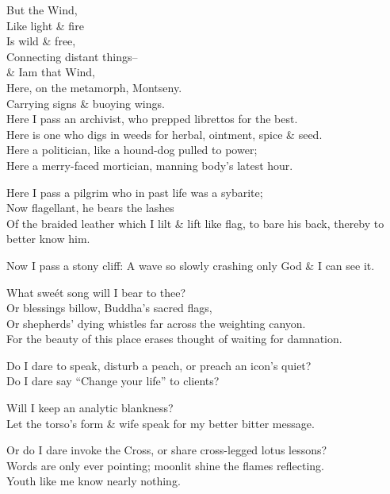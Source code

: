 
But the Wind, \\
Like light \& fire \\
Is wild \& free, \\
Connecting distant things-- \\
\& Iam that Wind, \\
Here, on the metamorph, Montseny. \\
Carrying signs \& buoying wings. \\
Here I pass an archivist, who prepped librettos for the best. \\ %
Here is one who digs in weeds for herbal, ointment, spice \& seed. \\
Here a politician, like a hound-dog pulled to power; \\
Here a merry-faced mortician, manning body's latest hour.

Here I pass a pilgrim who in past life was a sybarite; \\
Now flagellant, he bears the lashes \\
Of the braided leather which I lilt \& lift like flag, to bare his back, thereby to better know him.

Now I pass a stony cliff: A wave so slowly crashing only God \& I can see it. 

What sweét song will I bear to thee? \\
Or blessings billow, Buddha's sacred flags, \\
Or shepherds' dying whistles far across the weighting canyon. \\
For the beauty of this place erases thought of waiting for damnation.

Do I dare to speak, disturb a peach, or preach an icon's quiet? \\
Do I dare say ``Change your life'' to clients?

Will I keep an analytic blankness? \\
Let the torso's form \& wife speak for my better bitter message.

Or do I dare invoke the Cross, or share cross-legged lotus lessons? \\
Words are only ever pointing; moonlit shine the flames reflecting. \\
Youth like me know nearly nothing.